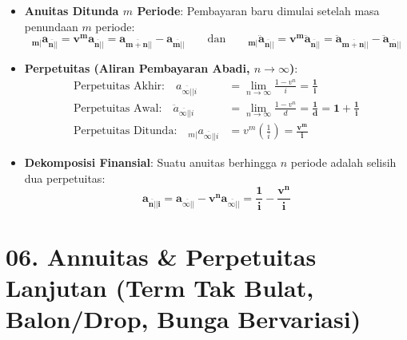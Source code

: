\documentclass[10pt,a4paper]{article}
\newcommand{\angl}[1]{\overline{#1|}}
\begin{document}
\begin{teoremabox}
\begin{itemize}[leftmargin=1.5em, topsep=1.5pt, itemsep=2pt]
    \item \textbf{Anuitas Ditunda $m$ Periode}: Pembayaran baru dimulai setelah masa penundaan $m$ periode:
    \begin{equation*}
        \mathbf{_{m|}a_{\angl{n}|} = v^m a_{\angl{n}|} = a_{\angl{m+n}|} - a_{\angl{m}|}} \qquad\text{dan}\qquad \mathbf{_{m|}\ddot{a}_{\angl{n}|} = v^m \ddot{a}_{\angl{n}|} = \ddot{a}_{\angl{m+n}|} - \ddot{a}_{\angl{m}|}}
    \end{equation*}
    \item \textbf{Perpetuitas (Aliran Pembayaran Abadi, $n \to \infty$)}:
    \begin{align*}
        \text{Perpetuitas Akhir:} \quad a_{\angl{\infty}|i} &= \lim_{n \to \infty} \frac{1 - v^n}{i} = \mathbf{\frac{1}{i}} \\[0.2em]
        \text{Perpetuitas Awal:} \quad \ddot{a}_{\angl{\infty}|i} &= \lim_{n \to \infty} \frac{1 - v^n}{d} = \mathbf{\frac{1}{d} = 1 + \frac{1}{i}} \\[0.2em]
        \text{Perpetuitas Ditunda:} \quad _{m|}a_{\angl{\infty}|i} &= v^m \left( \frac{1}{i} \right) = \mathbf{\frac{v^m}{i}}
    \end{align*}
    \item \textbf{Dekomposisi Finansial}: Suatu anuitas berhingga $n$ periode adalah selisih dua perpetuitas:
    \begin{equation*}
        \mathbf{a_{\angl{n}|i} = a_{\angl{\infty}|} - v^n a_{\angl{\infty}|} = \frac{1}{i} - \frac{v^n}{i}}
    \end{equation*}
\end{itemize}
\end{teoremabox}

\section*{\large 06. Annuitas \& Perpetuitas Lanjutan (Term Tak Bulat, Balon/Drop, Bunga Bervariasi)}
\end{document}

